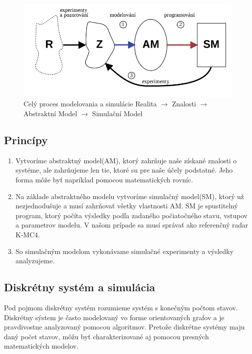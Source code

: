   \begin{figure}[h!]
      \centering
      \includegraphics[width=.85\textwidth]{obrazky-figures/simulacia.png}
      \caption{Celý proces modelovania a simulácie  Realita $\rightarrow$ Znalosti $\rightarrow$ Abstraktní Model $\rightarrow$ Simulační Model\cite{imsopora}}
      \label{fig:radar_kmc4}
  \end{figure}

  \subsection{Princípy}
    \begin{enumerate}
      \item Vytvoríme abstraktný model(AM), ktorý zahrňuje naše získané znalosti o systéme, ale zahrňujeme len tie, ktoré su pre naše účely podstatné. Jeho forma môže byť napríklad pomocou matematických rovníc.
      \item Na základe abstraktného modelu vytvoríme simulačný model(SM), ktorý už nezjednodušuje a musí zahrňovať všetky vlastnosti AM. SM je spustitelný program, ktorý počíta výsledky podľa zadaného počiatočného stavu, vstupov a parametrov modelu. V našom prípade sa musí správať ako referenčný radar K-MC4. 
      \item So simulačným modelom vykonávame simulačné experimenty a výsledky analyzujeme.
    \end{enumerate} 

  \subsection{Diskrétny systém a simulácia}
    \hspace{0.6cm}Pod pojmom diskrétny systém rozumieme systém s konečným počtom stavov.
    Diskrétny sýstem je často modelovaný vo forme orientovaných grafov a je pravdivostne analyzovaný pomocou algoritmov. Pretože diskrétne systémy maju daný počet stavov, môžu byť charakterizované aj pomocou presných matematických modelov.

